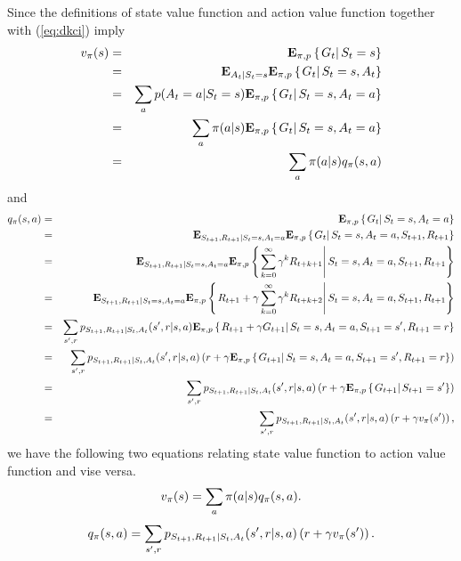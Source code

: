 Since the definitions of state value function and action value function together with (\ref{eq:dkci}) imply
\begin{eqnarray*}
v_{\pi}(s)
&=& \mathbf{E}_{\pi,p} \left\{\left.G_{t}\right|S_{t} = s\right\}
\\
&=& \mathbf{E}_{A_t|S_{t} =s} \mathbf{E}_{\pi,p} \left\{\left.G_{t}\right|S_{t} = s, A_t\right\}
\\
&=& \sum_a p(A_t=a|S_{t} =s) \mathbf{E}_{\pi,p} \left\{\left.G_{t}\right|S_{t} = s, A_t=a\right\}
\\
&=& \sum_a \pi(a|s) \mathbf{E}_{\pi,p} \left\{\left.G_{t}\right|S_{t} = s, A_t=a\right\}
\\
&=& \sum_a \pi(a|s) q_{\pi}(s,a)
\end{eqnarray*}
and
\begin{eqnarray*}
q_{\pi}(s, a)
&=& \mathbf{E}_{\pi,p} \left\{\left.G_{t}\right|S_{t} = s, A_t = a\right\}
\\
&=& \mathbf{E}_{S_{t+1}, R_{t+1}|S_{t}=s,A_t=a} \mathbf{E}_{\pi,p} \left\{\left.G_{t}\right|S_{t} = s, A_t = a, S_{t+1}, R_{t+1} \right\}
\\
&=& \mathbf{E}_{S_{t+1}, R_{t+1}|S_{t}=s,A_t=a} \mathbf{E}_{\pi,p} \left\{\left.\sum_{k=0}^\infty \gamma^k R_{t+k+1}\right|S_{t} = s, A_t = a, S_{t+1}, R_{t+1} \right\}
\\
&=& \mathbf{E}_{S_{t+1}, R_{t+1}|S_{t}=s,A_t=a} \mathbf{E}_{\pi,p} \left\{\left.R_{t+1} + \gamma \sum_{k=0}^\infty \gamma^k R_{t+k+2}\right|S_{t} = s, A_t = a, S_{t+1}, R_{t+1} \right\}
\\
&=& \sum_{{s'}, r} p_{S_{t+1}, R_{t+1}|S_{t},A_t}({s'}, r|s,a) \mathbf{E}_{\pi,p} \left\{\left.R_{t+1} + \gamma G_{t+1} \right|S_{t} = s, A_t = a, S_{t+1} = {s'}, R_{t+1} =r\right\}
\\
&=& \sum_{{s'}, r} p_{S_{t+1}, R_{t+1}|S_{t},A_t}({s'}, r|s,a) \left( r + \gamma \mathbf{E}_{\pi,p} \left\{\left.G_{t+1}\right|S_{t} = s, A_t = a, S_{t+1} = {s'}, R_{t+1} =r\right\} \right)
\\
&=& \sum_{{s'}, r} p_{S_{t+1}, R_{t+1}|S_{t},A_t}({s'}, r|s,a) \left( r + \gamma \mathbf{E}_{\pi,p} \left\{\left.G_{t+1}\right|S_{t+1} = {s'}\right\} \right)
\\
&=& \sum_{{s'}, r} p_{S_{t+1}, R_{t+1}|S_{t},A_t}({s'}, r|s,a) \left( r + \gamma v_{\pi}({s'}) \right),
\end{eqnarray*}
we have the following two equations relating state value function to action value function and vise versa.
\begin{equation}
\label{eq:rel:v-a}
v_{\pi}(s) = \sum_a \pi(a|s) q_{\pi}(s,a).
\end{equation}
\begin{equation}
\label{eq:rel:a-v}
q_{\pi}(s, a)
= \sum_{{s'}, r} p_{S_{t+1}, R_{t+1}|S_{t},A_t}({s'}, r|s,a) \left( r + \gamma v_{\pi}({s'}) \right).
\end{equation}

